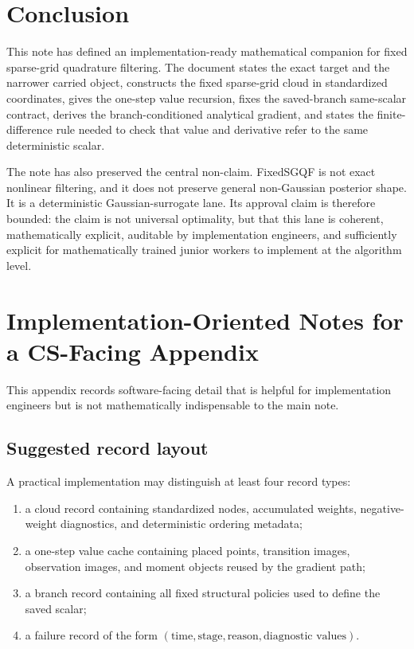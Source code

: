 \documentclass[11pt]{article}
\numberwithin{equation}{section}
\begin{document}
\section{Conclusion}
\label{sec:conclusion}

This note has defined an implementation-ready mathematical companion for fixed
sparse-grid quadrature filtering.  The document states the exact target and the
narrower carried object, constructs the fixed sparse-grid cloud in standardized
coordinates, gives the one-step value recursion, fixes the saved-branch
same-scalar contract, derives the branch-conditioned analytical gradient, and
states the finite-difference rule needed to check that value and derivative refer
to the same deterministic scalar.

The note has also preserved the central non-claim.  FixedSGQF is not exact
nonlinear filtering, and it does not preserve general non-Gaussian posterior
shape.  It is a deterministic Gaussian-surrogate lane.  Its approval claim is
therefore bounded: the claim is not universal optimality, but that this lane is
coherent, mathematically explicit, auditable by implementation engineers, and
sufficiently explicit for mathematically trained junior workers to implement at
the algorithm level.

\appendix

\section{Implementation-Oriented Notes for a CS-Facing Appendix}
\label{sec:appendix-cs}

This appendix records software-facing detail that is helpful for implementation
engineers but is not mathematically indispensable to the main note.

\subsection{Suggested record layout}

A practical implementation may distinguish at least four record types:
\begin{enumerate}[leftmargin=0.3in]
  \item a cloud record containing standardized nodes, accumulated weights,
  negative-weight diagnostics, and deterministic ordering metadata;
  \item a one-step value cache containing placed points, transition images,
  observation images, and moment objects reused by the gradient path;
  \item a branch record containing all fixed structural policies used to define
  the saved scalar;
  \item a failure record of the form
  \((\text{time},\text{stage},\text{reason},\text{diagnostic values})\).
\end{enumerate}
\end{document}
